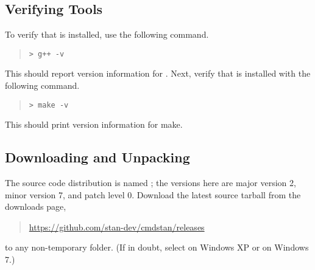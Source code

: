 \subsection{Verifying Tools}

To verify that \gpp is installed, use the following command.
%
\begin{quote}
  \Verb|> g++ -v|
\end{quote}
%
This should report version information for \gpp.  Next, verify that
 is installed with the following command.
%
\begin{quote}
  \Verb|> make -v|
\end{quote}
%
This should print version information for make.

\subsection{Downloading and Unpacking \CmdStan}

The \CmdStan source code distribution is named
; the versions here are major
version 2, minor version 7, and patch level 0.  Download the latest
\CmdStan source tarball from the \CmdStan downloads page,
%
\begin{quote}
\url{https://github.com/stan-dev/cmdstan/releases}
\end{quote}
%
to any non-temporary folder.  (If in doubt, select 
on Windows XP or  on Windows 7.)  

